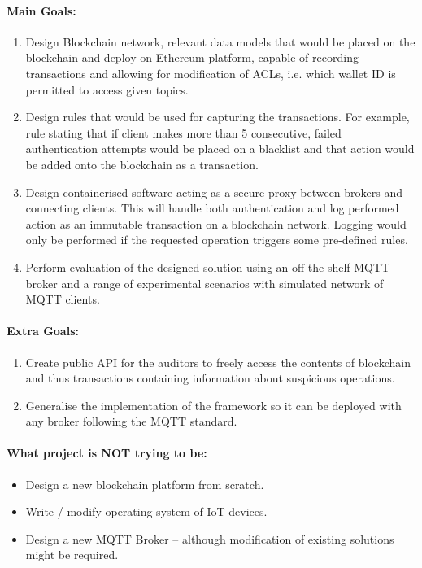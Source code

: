 \documentclass[a4paper,12pt]{article}
\begin{document}
\paragraph{Main Goals:}
\begin{enumerate}
  \item Design Blockchain network, relevant data models that would be placed on the blockchain and deploy on Ethereum platform, capable of recording transactions and allowing for modification of ACLs, i.e. which wallet ID is permitted to access given topics.
  \item Design rules that would be used for capturing the transactions. For example, rule stating that if client makes more than 5 consecutive, failed authentication attempts would be placed on a blacklist and that action would be added onto the blockchain as a transaction. 
  \item Design containerised software acting as a secure proxy between brokers and connecting clients. This will handle both authentication and log performed action as an immutable transaction on a blockchain network. Logging would only be performed if the requested operation triggers some pre-defined rules.
  \item Perform evaluation of the designed solution using an off the shelf MQTT broker and a range of experimental scenarios with simulated network of MQTT clients.
\end{enumerate}

\paragraph{Extra Goals:}
\begin{enumerate}
  \item Create public API for the auditors to freely access the contents of blockchain and thus transactions containing information about suspicious operations.
  \item Generalise the implementation of the framework so it can be deployed with any broker following the MQTT standard.
\end{enumerate}

\paragraph{What project is NOT trying to be:}
\begin{itemize}
  \item Design a new blockchain platform from scratch.
  \item Write / modify operating system of IoT devices.
  \item Design a new MQTT Broker -- although modification of existing solutions might be required.
\end{itemize}
\end{document}
